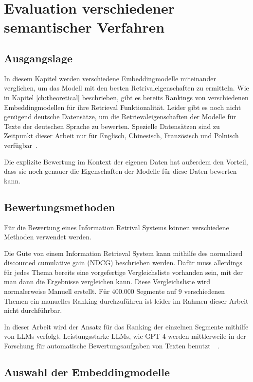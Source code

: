 \chapter{Evaluation verschiedener semantischer Verfahren}\label{ch:experiments}

\section{Ausgangslage}

In diesem Kapitel werden verschiedene Embeddingmodelle miteinander verglichen, um das Modell mit den besten Retrivaleigenschaften zu ermitteln.
Wie in Kapitel \autoref*{ch:theoretical} beschrieben, gibt es bereits Rankings von verschiedenen Embeddingmodellen für ihre Retrieval Funktionalität.
Leider gibt es noch nicht genügend deutsche Datensätze, um die Retrievaleigenschaften der Modelle für Texte der deutschen Sprache zu bewerten.
Spezielle Datensätzen sind zu Zeitpunkt dieser Arbeit nur für Englisch, Chinesisch, Französisch und Polnisch verfügbar~\cite{mteb}.

Die explizite Bewertung im Kontext der eigenen Daten hat außerdem den Vorteil, dass sie noch genauer die Eigenschaften der Modelle für diese Daten bewerten kann.

\section{Bewertungsmethoden}

Für die Bewertung eines Information Retrival Systems können verschiedene Methoden verwendet werden.

Die Güte von einem Information Retrieval System kann mithilfe des normalized discounted cumulative gain (NDCG) beschrieben werden. 
Dafür muss allerdings für jedes Thema bereits eine vorgefertige Vergleichsliste vorhanden sein, mit der man dann die Ergebnisse vergleichen kann.
Diese Vergleichsliste wird normalerweise Manuell erstellt.
Für 400.000 Segmente auf 9 verschiedenen Themen ein manuelles Ranking durchzuführen ist leider im Rahmen dieser Arbeit nicht durchführbar.

In dieser Arbeit wird der Ansatz für das Ranking der einzelnen Segmente mithilfe von LLMs verfolgt.
Leistungsstarke LLMs, wie GPT-4 werden mittlerweile in der Forschung für automatische Bewertungsaufgaben von Texten benutzt~\cite{naismith2023}~\cite{nilsson2023}.

\section{Auswahl der Embeddingmodelle}

